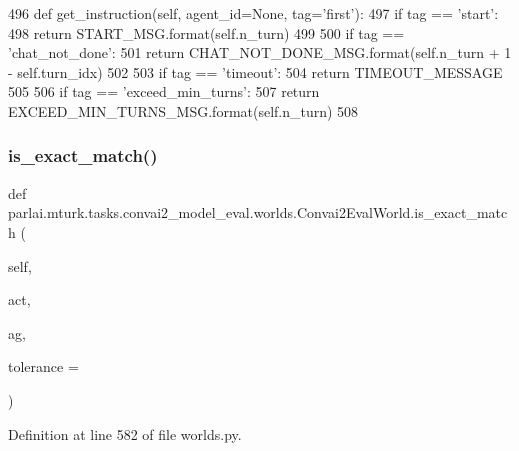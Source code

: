 \begin{DoxyCode}
496     \textcolor{keyword}{def }get\_instruction(self, agent\_id=None, tag='first'):
497         \textcolor{keywordflow}{if} tag == \textcolor{stringliteral}{'start'}:
498             \textcolor{keywordflow}{return} START\_MSG.format(self.n\_turn)
499 
500         \textcolor{keywordflow}{if} tag == \textcolor{stringliteral}{'chat\_not\_done'}:
501             \textcolor{keywordflow}{return} CHAT\_NOT\_DONE\_MSG.format(self.n\_turn + 1 - self.turn\_idx)
502 
503         \textcolor{keywordflow}{if} tag == \textcolor{stringliteral}{'timeout'}:
504             \textcolor{keywordflow}{return} TIMEOUT\_MESSAGE
505 
506         \textcolor{keywordflow}{if} tag == \textcolor{stringliteral}{'exceed\_min\_turns'}:
507             \textcolor{keywordflow}{return} EXCEED\_MIN\_TURNS\_MSG.format(self.n\_turn)
508 
\end{DoxyCode}
\mbox{\label{classparlai_1_1mturk_1_1tasks_1_1convai2__model__eval_1_1worlds_1_1Convai2EvalWorld_af615b8beec269ea925c371b955669770}} 
\subsubsection{\texorpdfstring{is\+\_\+exact\+\_\+match()}{is\_exact\_match()}}
{\footnotesize\ttfamily def parlai.\+mturk.\+tasks.\+convai2\+\_\+model\+\_\+eval.\+worlds.\+Convai2\+Eval\+World.\+is\+\_\+exact\+\_\+match (\begin{DoxyParamCaption}\item[{}]{self,  }\item[{}]{act,  }\item[{}]{ag,  }\item[{}]{tolerance = {} }\end{DoxyParamCaption})}



Definition at line 582 of file worlds.\+py.


